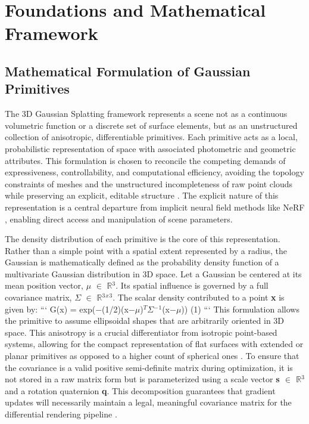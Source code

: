 \documentclass[11pt,a4paper]{article}
\begin{document}
\section{Foundations and Mathematical Framework}



\subsection{Mathematical Formulation of Gaussian Primitives}


The 3D Gaussian Splatting framework represents a scene not as a continuous volumetric function or a discrete set of surface elements, but as an unstructured collection of anisotropic, differentiable primitives. Each primitive acts as a local, probabilistic representation of space with associated photometric and geometric attributes. This formulation is chosen to reconcile the competing demands of expressiveness, controllability, and computational efficiency, avoiding the topology constraints of meshes and the unstructured incompleteness of raw point clouds while preserving an explicit, editable structure \cite{arxiv:2308.04079v1,arxiv:2401.03890v2}. The explicit nature of this representation is a central departure from implicit neural field methods like NeRF \cite{arxiv:2112.05131v1,arxiv:2004.07484v3}, enabling direct access and manipulation of scene parameters.

The density distribution of each primitive is the core of this representation. Rather than a simple point with a spatial extent represented by a radius, the Gaussian is mathematically defined as the probability density function of a multivariate Gaussian distribution in 3D space. Let a Gaussian be centered at its mean position vector, \textbf{$\mu$} $\in$ $\mathbb{R}$$^{3}$. Its spatial influence is governed by a full covariance matrix, \textbf{$\Sigma$} $\in$ $\mathbb{R}$$^{3}$$^{x}$$^{3}$. The scalar density contributed to a point \textbf{x} is given by:
```
G(x) = exp($-$(1/2)(x$-$$\mu$)$^{T}$$\Sigma$$^{-}$$^{1}$(x$-$$\mu$))   (1)
```
This formulation allows the primitive to assume ellipsoidal shapes that are arbitrarily oriented in 3D space. This anisotropy is a crucial differentiator from isotropic point-based systems, allowing for the compact representation of flat surfaces with extended or planar primitives as opposed to a higher count of spherical ones \cite{arxiv:2403.17888v1}. To ensure that the covariance is a valid positive semi-definite matrix during optimization, it is not stored in a raw matrix form but is parameterized using a scale vector \textbf{s $\in$ $\mathbb{R}$$^{3}$} and a rotation quaternion \textbf{q}. This decomposition guarantees that gradient updates will necessarily maintain a legal, meaningful covariance matrix for the differential rendering pipeline \cite{arxiv:2308.04079v1,arxiv:2311.13681v2}.
\end{document}
